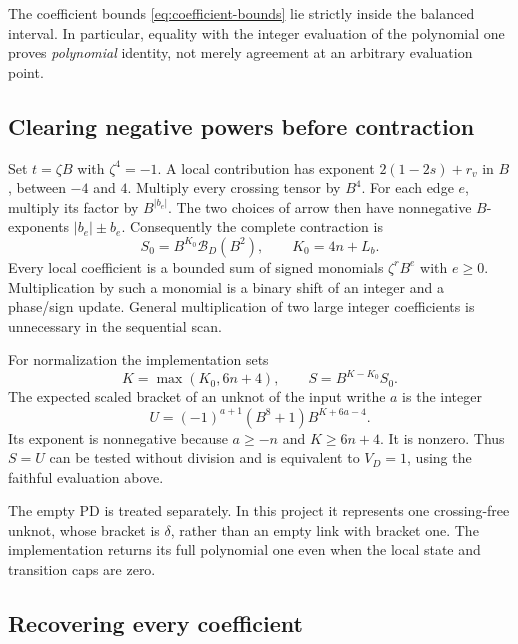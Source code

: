 \documentclass[11pt]{article}
\theoremstyle{definition}
\theoremstyle{remark}
\begin{document}
The coefficient bounds \eqref{eq:coefficient-bounds} lie strictly inside
the balanced interval. In particular, equality with the integer evaluation
of the polynomial one proves \emph{polynomial} identity, not merely
agreement at an arbitrary evaluation point.

\subsection{Clearing negative powers before contraction}

Set $t=\zeta B$ with $\zeta^4=-1$. A local contribution has exponent
$2(1-2s)+r_v$ in $B$, between $-4$ and $4$. Multiply every crossing
tensor by $B^4$. For each edge $e$, multiply its factor by
$B^{|b_e|}$. The two choices of arrow then have nonnegative $B$-exponents
$|b_e|\pm b_e$. Consequently the complete contraction is
\begin{equation}\label{eq:scaled-bracket}
 S_0=B^{K_0}\mathcal B_D(B^2),
 \qquad K_0=4n+L_b.
\end{equation}
Every local coefficient is a bounded sum of signed monomials
$\zeta^r B^e$ with $e\ge0$. Multiplication by such a monomial is a binary
shift of an integer and a phase/sign update. General multiplication of
two large integer coefficients is unnecessary in the sequential scan.

For normalization the implementation sets
\begin{equation}\label{eq:normalization-shift}
 K=\max(K_0,6n+4),\qquad S=B^{K-K_0}S_0.
\end{equation}
The expected scaled bracket of an unknot of the input writhe $a$ is the
integer
\begin{equation}\label{eq:unknot-scalar}
 U=(-1)^{a+1}(B^8+1)B^{K+6a-4}.
\end{equation}
Its exponent is nonnegative because $a\ge-n$ and $K\ge6n+4$.
It is nonzero. Thus $S=U$ can be tested without division and is equivalent
to $V_D=1$, using the faithful evaluation above.

The empty PD is treated separately. In this project it represents one
crossing-free unknot, whose bracket is $\delta$, rather than an empty
link with bracket one. The implementation returns its full polynomial
one even when the local state and transition caps are zero.

\subsection{Recovering every coefficient}
\end{document}
